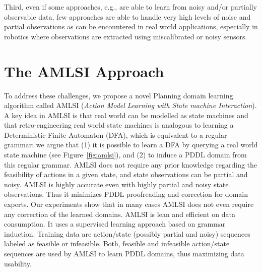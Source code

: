 Third, even if some approaches, e.g., \cite{lsonio,planMilner,irale} are able to learn from noisy and/or partially observable data, few approaches are able to handle very high levels of noise and partial observations as can be encountered in real world applications, especially in robotics where observations are extracted using miscalibrated or noisy sensors.

\section{The AMLSI Approach}

To address these challenges, we propose a novel Planning domain learning algorithm called AMLSI ({\em Action Model Learning with State machine Interaction}). A key idea in AMLSI is that real world can be modelled as state machines and that retro-engineering real world
state machines is analogous to learning a Deterministic Finite Automaton (DFA), which is equivalent to a regular grammar: we argue that (1) it is possible to learn a DFA by querying a real world state machine (see Figure~\ref{fig:amlsi}), and (2) to induce a PDDL domain from this regular grammar. AMLSI does not require any prior knowledge regarding the feasibility of actions in a given state, and state observations can be partial and noisy. AMLSI is highly accurate even with highly partial and noisy state observations. Thus it minimizes PDDL proofreading and correction for domain experts. Our experiments show that in many cases AMLSI does not even require any correction of the learned domains. AMLSI is lean and efficient on data consumption. It uses a supervised learning approach based on grammar induction. Training data are action/state (possibly partial and noisy) sequences labeled as feasible or infeasible. Both, feasible and infeasible action/state sequences are used by AMLSI to learn PDDL domains, thus maximizing data usability.


